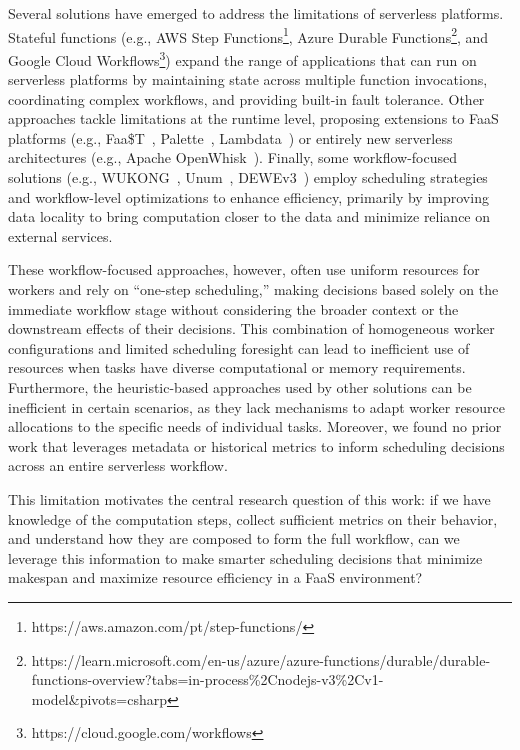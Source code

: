 \documentclass[conference]{IEEEtran}
\begin{document}
Several solutions have emerged to address the limitations of serverless platforms. Stateful functions (e.g., AWS Step Functions\footnote{\label{fn:aws-step-functions}https://aws.amazon.com/pt/step-functions/}, Azure Durable Functions\footnote{\label{fn:azure-durable-functions}https://learn.microsoft.com/en-us/azure/azure-functions/durable/durable-functions-overview?tabs=in-process\%2Cnodejs-v3\%2Cv1-model\&pivots=csharp}, and Google Cloud Workflows\footnote{\label{fn:google-cloud-workflows}https://cloud.google.com/workflows}) expand the range of applications that can run on serverless platforms by maintaining state across multiple function invocations, coordinating complex workflows, and providing built-in fault tolerance. Other approaches tackle limitations at the runtime level, proposing extensions to FaaS platforms (e.g., Faa\$T~\cite{faast_caching}, Palette~\cite{palette_load_balancing}, Lambdata~\cite{lambdata_intents}) or entirely new serverless architectures (e.g., Apache OpenWhisk~\cite{open_whisk}). Finally, some workflow-focused solutions (e.g., WUKONG~\cite{wukong_2}, Unum~\cite{unum_decentralized_orchestrator}, DEWEv3~\cite{dewe_v3}) employ scheduling strategies and workflow-level optimizations to enhance efficiency, primarily by improving data locality to bring computation closer to the data and minimize reliance on external services.

These workflow-focused approaches, however, often use uniform resources for workers and rely on “one-step scheduling,” making decisions based solely on the immediate workflow stage without considering the broader context or the downstream effects of their decisions. This combination of homogeneous worker configurations and limited scheduling foresight can lead to inefficient use of resources when tasks have diverse computational or memory requirements. Furthermore, the heuristic-based approaches used by other solutions can be inefficient in certain scenarios, as they lack mechanisms to adapt worker resource allocations to the specific needs of individual tasks. Moreover, we found no prior work that leverages metadata or historical metrics to inform scheduling decisions across an entire serverless workflow.  

This limitation motivates the central research question of this work: if we have knowledge of the computation steps, collect sufficient metrics on their behavior, and understand how they are composed to form the full workflow, can we leverage this information to make smarter scheduling decisions that minimize makespan and maximize resource efficiency in a FaaS environment?  
\end{document}
